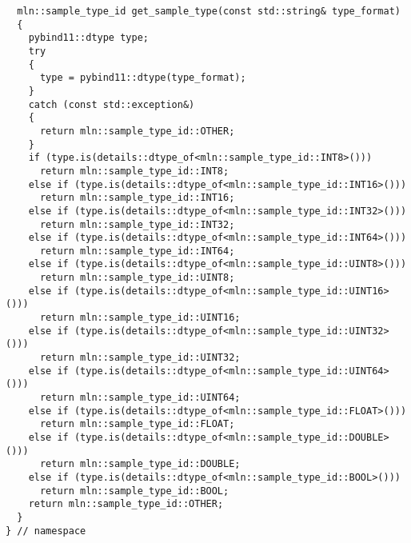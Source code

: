 \begin{verbatim}
  mln::sample_type_id get_sample_type(const std::string& type_format)
  {
    pybind11::dtype type;
    try
    {
      type = pybind11::dtype(type_format);
    }
    catch (const std::exception&)
    {
      return mln::sample_type_id::OTHER;
    }
    if (type.is(details::dtype_of<mln::sample_type_id::INT8>()))
      return mln::sample_type_id::INT8;
    else if (type.is(details::dtype_of<mln::sample_type_id::INT16>()))
      return mln::sample_type_id::INT16;
    else if (type.is(details::dtype_of<mln::sample_type_id::INT32>()))
      return mln::sample_type_id::INT32;
    else if (type.is(details::dtype_of<mln::sample_type_id::INT64>()))
      return mln::sample_type_id::INT64;
    else if (type.is(details::dtype_of<mln::sample_type_id::UINT8>()))
      return mln::sample_type_id::UINT8;
    else if (type.is(details::dtype_of<mln::sample_type_id::UINT16>()))
      return mln::sample_type_id::UINT16;
    else if (type.is(details::dtype_of<mln::sample_type_id::UINT32>()))
      return mln::sample_type_id::UINT32;
    else if (type.is(details::dtype_of<mln::sample_type_id::UINT64>()))
      return mln::sample_type_id::UINT64;
    else if (type.is(details::dtype_of<mln::sample_type_id::FLOAT>()))
      return mln::sample_type_id::FLOAT;
    else if (type.is(details::dtype_of<mln::sample_type_id::DOUBLE>()))
      return mln::sample_type_id::DOUBLE;
    else if (type.is(details::dtype_of<mln::sample_type_id::BOOL>()))
      return mln::sample_type_id::BOOL;
    return mln::sample_type_id::OTHER;
  }
} // namespace



\end{verbatim}
